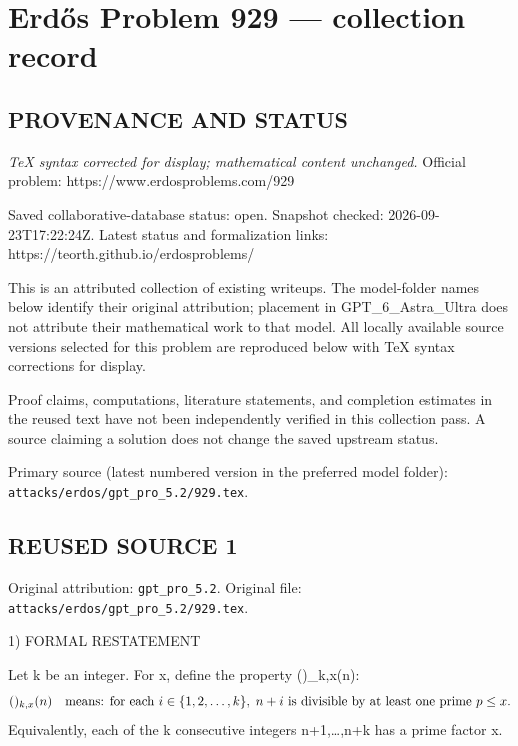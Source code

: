 \section*{Erd\H{o}s Problem 929 --- collection record}

\subsection*{PROVENANCE AND STATUS}

\emph{TeX syntax corrected for display; mathematical content unchanged.}
Official problem: https://www.erdosproblems.com/929

Saved collaborative-database status: open.
Snapshot checked: 2026-09-23T17:22:24Z.
Latest status and formalization links: https://teorth.github.io/erdosproblems/

This is an attributed collection of existing writeups. The model-folder names below identify their original attribution; placement in GPT\_6\_Astra\_Ultra does not attribute their mathematical work to that model. All locally available source versions selected for this problem are reproduced below with TeX syntax corrections for display.

Proof claims, computations, literature statements, and completion estimates in the reused text have not been independently verified in this collection pass. A source claiming a solution does not change the saved upstream status.

Primary source (latest numbered version in the preferred model folder): \texttt{attacks/erdos/gpt\_pro\_5.2/929.tex}.

\subsection*{REUSED SOURCE 1}
Original attribution: \texttt{gpt\_pro\_5.2}.
Original file: \texttt{attacks/erdos/gpt\_pro\_5.2/929.tex}.


1) FORMAL RESTATEMENT

Let k be an integer.
For x, define the property (\*)_{k,x}(n):
\[(\*)_{k,x}(n)\quad\text{means: for each } i\in\{1,2,\dots,k\},\; n+i \text{ is divisible by at least one prime } p\le x.\]
Equivalently, each of the k consecutive integers n+1,\dots,n+k has a prime factor \le x.

